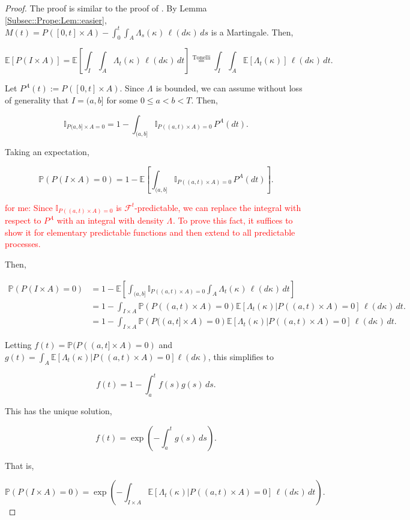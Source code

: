 \documentclass[12pt]{article}
\newcommand{\mb}{\mathbb}
\newcommand{\mc}{\mathcal}
\newcommand{\os}{\overset}
\newcommand{\te}{\text}
\newcommand{\tr}{\textcolor{red}}
\newcommand{\ind}{\hspace{24pt}}
\newcommand{\pr}{\mb{P}}							%
\newcommand{\ex}[1]{\mb{E}\left[#1\right]}			%
\newcommand{\defeq}{:=}								%
\renewcommand{\S}{S}							%
\newcommand{\T}{T}								%
\renewcommand{\t}{t}							%
\renewcommand{\tt}{s}								%
\newcommand{\rp}[1]{P^{#1}}							%
\newcommand{\ratee}[1]{\Lambda_{#1}}				%
\newcommand{\F}[2]{\mc{F}_{#1}^{#2}}				%
\newcommand{\Sm}{\ell}								%
\newcommand{\typset}{A}							%
\renewcommand{\mark}[1]{\kappa^{#1}}				%
\begin{document}
\begin{proof}
The proof is similar to the proof of \cite[Lemma 1]{BreMas96}. By Lemma \ref{Subsec::Prope:Lem::easier}, \(M(t) = \rp{}([0,\t]\times \typset) - \int_0^\t \int_{\typset} \ratee{\tt}(\mark{})\,\Sm{}(d\mark{})\,d\tt\) is a Martingale. Then,

\[\ex{\rp{}(I\times\typset)} = \ex{\int_I\int_\typset \ratee{\t}(\mark{})\,\Sm(d\mark{})\,d\t} \os{\te{Tonelli}}{=} \int_I\int_\typset \ex{\ratee{\t}(\mark{})}\,\Sm(d\mark{})\,d\t.\]

Let \(\rp{\typset}(\t) \defeq \rp{}([0,\t]\times \typset)\). Since \(\ratee{}\) is bounded, we can assume without loss of generality that \(I = (a,b]\) for some \(0 \leq a < b < \T\). Then,

\[\mb{I}_{\rp{}{(a,b]\times \typset} = 0} = 1 - \int_{(a,b]} \mb{I}_{\rp{}((a,\t)\times \typset) = 0}\,\rp{\typset}(d\t).\]


Taking an expectation,

\[\pr\left(\rp{}(I\times\typset)=0\right) = 1 - \ex{\int_{(a,b]}\mb{I}_{\rp{}((a,\t)\times \typset) = 0}\,\rp{\typset}(d\t)}.\]

\tr{for me: Since \(\mb{I}_{\rp{}((a,\t)\times \typset) = 0}\) is \(\F{}{\t}\)-predictable, we can replace the integral with respect to \(\rp{\typset}\) with an integral with density \(\ratee{}\). To prove this fact, it suffices to show it for elementary predictable functions and then extend to all predictable processes.}

\ind Then,

\begin{align*}
\pr\left(\rp{}(I\times\typset)=0\right) &= 1 - \ex{\int_{(a,b]}\mb{I}_{\rp{}((a,\t)\times \typset) = 0}\int_\typset\ratee{\t}(\mark{})\,\Sm(d\mark{})\,d\t}\\
& = 1 - \int_{I\times \typset} \pr\left(\rp{}((a,\t)\times\typset) = 0\right)\ex{\ratee{\t}(\mark{})|\rp{}((a,\t)\times\typset) = 0}\,\Sm(d\mark{})\,d\t.\\
& = 1 - \int_{I\times \typset} \pr\left(\rp{}((a,\t]\times\typset) = 0\right)\ex{\ratee{\t}(\mark{})|\rp{}((a,\t)\times\typset) = 0}\,\Sm(d\mark{})\,d\t.
\end{align*}

Letting \(f(\t) = \pr(\rp{}((a,\t]\times \typset) = 0)\) and \(g(\t) = \int_A\ex{\ratee{\t}(\mark{})|\rp{}((a,\t)\times \typset) = 0}\Sm(d\mark{})\), this simplifies to

\[f(\t) = 1 - \int_a^\t f(\tt)g(\tt)\,d\tt.\]

This has the unique solution,

\[f(\t) = \exp\left(-\int_a^\t g(\tt)\,d\tt\right).\]

That is,

\[\pr\left(\rp{}(I\times\typset) = 0\right) = \exp\left(-\int_{I\times\typset} \ex{\ratee{\t}(\mark{})|\rp{}((a,\t)\times\typset) = 0}\,\Sm(d\mark{})\,d\t\right).\]

\end{proof}
\end{document}
